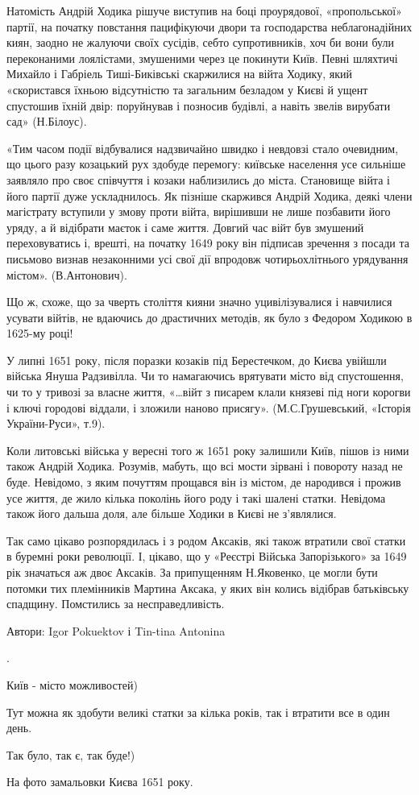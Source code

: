 Натомість Андрій Ходика рішуче виступив на боці проурядової, «пропольської»
партії, на початку повстання пацифікуючи двори та господарства неблагонадійних
киян, заодно не жалуючи своїх сусідів, себто супротивників, хоч би вони були
переконаними лоялістами, змушеними через це покинути Київ. Певні шляхтичі
Михайло і Габріель Тиші-Биківські скаржилися на війта Ходику, який «скористався
їхньою відсутністю та загальним безладом у Києві й ущент спустошив їхній двір:
поруйнував і позносив будівлі, а навіть звелів вирубати сад» (Н.Білоус).

«Тим часом події відбувалися надзвичайно швидко і невдовзі стало очевидним, що
цього разу козацький рух здобуде перемогу: київське населення усе сильніше
заявляло про своє співчуття і козаки наблизились до міста. Становище війта і
його партії дуже ускладнилось. Як пізніше скаржився Андрій Ходика, деякі члени
магістрату вступили у змову проти війта, вирішивши не лише позбавити його
уряду, а й відібрати маєток і саме життя. Довгий час війт був змушений
переховуватись і, врешті, на початку 1649 року він підписав зречення з посади
та письмово визнав незаконними усі свої дії впродовж чотирьохлітнього
урядування містом». (В.Антонович).

Що ж, схоже, що за чверть століття кияни значно уцивілізувалися і навчилися
усувати війтів, не вдаючись до драстичних методів, як було з Федором Ходикою в
1625-му році!

У липні 1651 року, після поразки козаків під Берестечком, до Києва увійшли
війська Януша Радзивілла. Чи то намагаючись врятувати місто від спустошення, чи
то у тривозі за власне життя, «…війт з писарем клали князеві під ноги корогви і
ключі городові віддали, і зложили наново присягу». (М.С.Грушевський, «Історія
України-Руси», т.9). 

Коли литовські війська у вересні того ж 1651 року залишили  Київ, пішов із ними
також Андрій Ходика. Розумів, мабуть, що всі мости зірвані і повороту назад не
буде. Невідомо, з яким почуттям прощався він із містом, де народився і прожив
усе життя, де жило кілька поколінь його роду і такі шалені статки. Невідома
також його дальша доля, але більше Ходики в Києві не з’являлися.

Так само цікаво розпорядилась і з родом Аксаків, які також втратили свої статки
в буремні роки революції. І, цікаво, що у «Реєстрі Війська Запорізького» за
1649 рік значаться аж двоє Аксаків. За припущенням Н.Яковенко, це могли бути
потомки тих племінників Мартина Аксака, у яких він колись відібрав батьківську
спадщину. Помстились за несправедливість.

Автори: Igor Pokuektov і Tin-tina Antonina

.

Київ - місто можливостей)

Тут можна як здобути великі статки за кілька років, так і втратити все в один
день.

Так було, так є, так буде!)

На фото замальовки Києва 1651 року.

